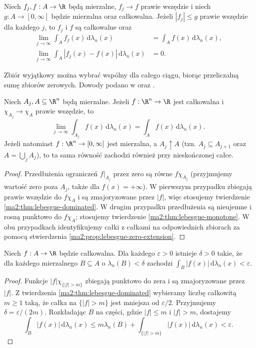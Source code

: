 \begin{twierdzenie}
\label{ma2:thm:lebesgue-dominated}
Niech $f_j,f:A\to\R$ będą mierzalne,
$f_j\to f$ prawie wszędzie i niech
$g:A\to[0,\infty]$ będzie mierzalna
oraz całkowalna. Jeżeli $|f_j|\le g$
prawie wszędzie dla każdego $j$, to $f_j$
i $f$ są całkowalne oraz
\[
 \begin{aligned}
 \lim_{j\to\infty}\int_A f_j(x)\,\mathrm d\lambda_n(x)
 &=\int_A f(x)\,\mathrm d\lambda_n(x),\\
 \lim_{j\to\infty}\int_A |f_j(x)-f(x)|\,\mathrm d\lambda_n(x)
 &=0.
 \end{aligned}
\]
\end{twierdzenie}
Zbiór wyjątkowy można wybrać wspólny dla
całego ciągu, biorąc przeliczalną sumę
zbiorów zerowych. Dowody podano w
oraz .

\begin{wniosek}
\label{ma2:cor:lebesgue-moving-sets}
Niech $A_j,A\subseteq\R^n$ będą mierzalne.
Jeżeli $f:\R^n\to\R$ jest całkowalna i
$\chi_{A_j}\to\chi_A$ prawie wszędzie, to
\[
 \lim_{j\to\infty}\int_{A_j} f(x)\,\mathrm d\lambda_n(x)
 =\int_A f(x)\,\mathrm d\lambda_n(x).
\]
Jeżeli natomiast $f:\R^n\to[0,\infty]$
jest mierzalna, a $A_j\uparrow A$
(tzn. $A_j\subseteq A_{j+1}$ oraz
$A=\bigcup_j A_j$), to ta sama równość
zachodzi również przy nieskończonej całce.
\end{wniosek}
\begin{proof}
Przedłużenia ograniczeń $f|_{A_j}$ przez
zero są równe $f\chi_{A_j}$ (przyjmujemy
wartość zero poza $A_j$, także dla
$f(x)=+\infty$).
W pierwszym przypadku zbiegają prawie
wszędzie do $f\chi_A$ i są zmajoryzowane
przez $|f|$, więc stosujemy twierdzenie
\ref{ma2:thm:lebesgue-dominated}.
W drugim przypadku przedłużenia są
nieujemne i rosną punktowo do $f\chi_A$;
stosujemy twierdzenie
\ref{ma2:thm:lebesgue-monotone}.
W obu przypadkach identyfikujemy całki
z całkami na odpowiednich zbiorach za pomocą
stwierdzenia \ref{ma2:prop:lebesgue-zero-extension}.
\end{proof}

\begin{wniosek}
\label{ma2:cor:lebesgue-absolute-cont}
Niech $f:A\to\R$ będzie całkowalna.
Dla każdego $\varepsilon>0$ istnieje
$\delta>0$ takie, że dla każdego
mierzalnego $B\subseteq A$ o
$\lambda_n(B)<\delta$ zachodzi
$\int_B |f(x)|\,\mathrm d\lambda_n(x)<\varepsilon$.
\end{wniosek}
\begin{proof}
Funkcje $|f|\chi_{\{|f|>m\}}$ zbiegają
punktowo do zera i są zmajoryzowane
przez $|f|$. Z twierdzenia
\ref{ma2:thm:lebesgue-dominated} wybieramy
liczbę całkowitą $m\ge1$ taką, że
całka na $\{|f|>m\}$ jest mniejsza
od $\varepsilon/2$. Przyjmujemy
$\delta=\varepsilon/(2m)$.
Rozkładając $B$ na części, gdzie
$|f|\le m$ i $|f|>m$, dostajemy
\[
 \int_B|f(x)|\,\mathrm d\lambda_n(x)
 \le m\lambda_n(B)
 +\int_{\{|f|>m\}}|f(x)|\,\mathrm d\lambda_n(x)
 <\varepsilon.
\]
\end{proof}


